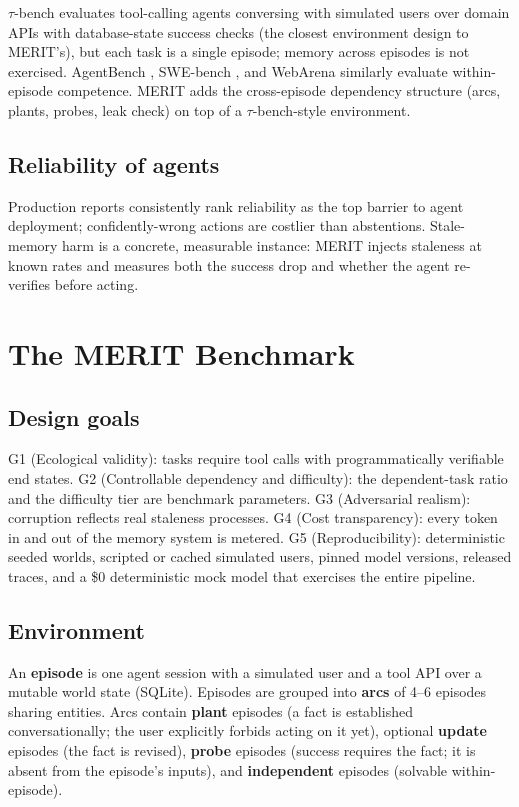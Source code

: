 \documentclass[11pt]{article}
\newcommand{\merit}{\textsc{MERIT}}
\begin{document}
$\tau$-bench \citep{taubench} evaluates tool-calling agents conversing with
simulated users over domain APIs with database-state success checks (the
closest environment design to \merit{}'s), but each task is a single episode;
memory across episodes is not exercised. AgentBench \citep{agentbench},
SWE-bench \citep{swebench}, and WebArena \citep{webarena} similarly evaluate
within-episode competence. \merit{} adds the cross-episode dependency
structure (arcs, plants, probes, leak check) on top of a $\tau$-bench-style
environment.

\subsection{Reliability of agents}

Production reports consistently rank reliability as the top barrier to agent
deployment; confidently-wrong actions are costlier than abstentions.
Stale-memory harm is a concrete, measurable instance: \merit{} injects
staleness at known rates and measures both the success drop and whether the
agent re-verifies before acting.

\section{The \merit{} Benchmark}

\subsection{Design goals}

G1 (Ecological validity): tasks require tool calls with programmatically
verifiable end states. G2 (Controllable dependency and difficulty): the
dependent-task ratio and the difficulty tier are benchmark parameters. G3
(Adversarial realism): corruption reflects real staleness processes. G4 (Cost
transparency): every token in and out of the memory system is metered. G5
(Reproducibility): deterministic seeded worlds, scripted or cached simulated
users, pinned model versions, released traces, and a \$0 deterministic mock
model that exercises the entire pipeline.

\subsection{Environment}

An \textbf{episode} is one agent session with a simulated user and a tool API
over a mutable world state (SQLite). Episodes are grouped into \textbf{arcs}
of 4--6 episodes sharing entities. Arcs contain \textbf{plant} episodes (a
fact is established conversationally; the user explicitly forbids acting on
it yet), optional \textbf{update} episodes (the fact is revised),
\textbf{probe} episodes (success requires the fact; it is absent from the
episode's inputs), and \textbf{independent} episodes (solvable
within-episode).
\end{document}
